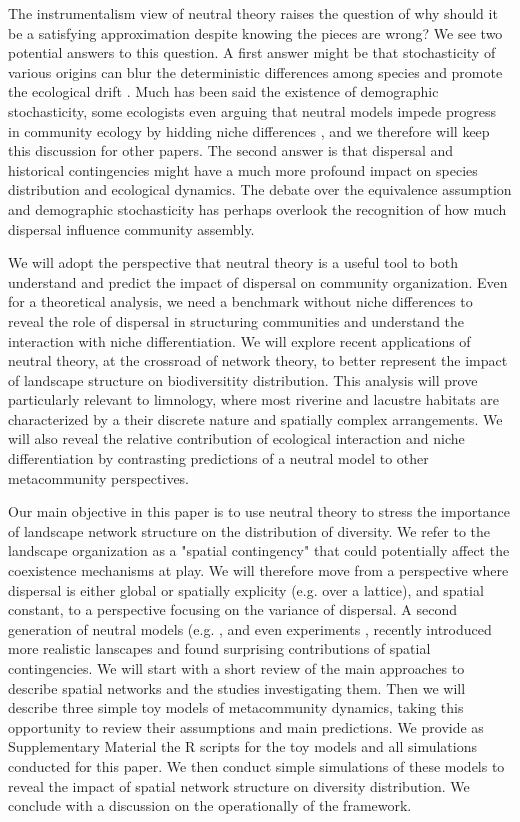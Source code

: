 \documentclass[12pt]{article}
\begin{document}
The instrumentalism view of neutral theory raises the question of why should it
be a satisfying approximation despite knowing the pieces are wrong? We see two
potential answers to this question. A first answer might be that stochasticity
of various origins can blur the deterministic differences among species and
promote the ecological drift \parencite{Gravel2011}. Much has been said the
existence of demographic stochasticity, some ecologists even arguing that
neutral models impede progress in community ecology by hidding niche differences
\parencite{Clark2012}, and we therefore will keep this discussion for other
papers. The second answer is that dispersal and historical contingencies might
have a much more profound impact on species distribution \parencite{Bahn2007}
and ecological dynamics. The debate over the equivalence assumption and
demographic stochasticity has perhaps overlook the recognition of how much
dispersal influence community assembly.

We will adopt the perspective that neutral theory is a useful tool to both
understand and predict the impact of dispersal on community organization. Even
for a theoretical analysis, we need a benchmark without niche differences to
reveal the role of dispersal in structuring communities and understand the
interaction with niche differentiation. We will explore recent applications of
neutral theory, at the crossroad of network theory, to better represent the
impact of landscape structure on biodiversitity distribution. This analysis will
prove particularly relevant to limnology, where most riverine and lacustre
habitats are characterized by a their discrete nature and spatially complex
arrangements. We will also reveal the relative contribution of ecological
interaction and niche differentiation by contrasting predictions of a neutral
model to other metacommunity perspectives. 

Our main objective in this paper is to use neutral theory to stress the
importance of landscape network structure on the distribution of diversity. We
refer to the landscape organization as a "spatial contingency"
\parencite{Peres-Neto2013} that could potentially affect the coexistence
mechanisms at play. We will therefore move from a perspective where dispersal is
either global or spatially explicity (e.g. over a lattice), and spatial
constant, to a perspective focusing on the variance of dispersal. A second
generation of neutral models (e.g. \textcite{Economo2008,
Economo2011,Desjardins2012a,Desjardins2012b}, and even experiments
\parencite{Altermat2012}, recently introduced more realistic lanscapes and found
surprising contributions of spatial contingencies. We will start with a short
review of the main approaches to describe spatial networks and the studies
investigating them. Then we will describe three simple toy models of
metacommunity dynamics, taking this opportunity to review their assumptions and
main predictions. We provide as Supplementary Material the R scripts for the toy
models and all simulations conducted for this paper. We then conduct simple
simulations of these models to reveal the impact of spatial network structure on
diversity distribution. We conclude with a discussion on the operationally of
the framework.
\end{document}
